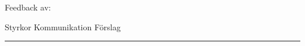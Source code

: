 \begin{questions}
\setlength\itemsep{2\baselineskip}



 





 

 



 

 

 
\newpage
\begin{center}
  Feedback av:\enspace\makebox[2in]{\hrulefill}\\
\end{center}

\smallskip
\noindent Styrkor \hfill Kommunikation \hfill Förslag \hrule


\end{questions}
